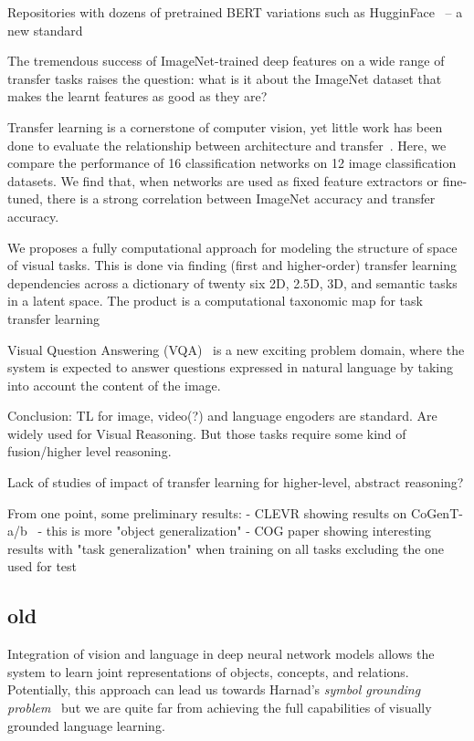 Repositories with dozens of pretrained BERT variations such as HugginFace~\cite{wolf2019transformers} -- a new standard



The tremendous success of ImageNet-trained deep features on a wide range of transfer tasks raises the question:
what is it about the ImageNet dataset that makes the learnt
features as good as they are?~\cite{huh2016makes}

Transfer learning is a cornerstone of computer vision,
yet little work has been done to evaluate the relationship
between architecture and transfer~\cite{kornblith2019better}.
Here, we compare the performance of 16 classification networks on 12 image classification datasets. We find that, when networks are used as fixed feature extractors or fine-tuned, there is a strong correlation between ImageNet accuracy and transfer accuracy.

We proposes a fully computational approach for modeling the structure of space of visual tasks. This is done via
finding (first and higher-order) transfer learning dependencies across a dictionary of twenty six 2D, 2.5D, 3D, and
semantic tasks in a latent space. The product is a computational taxonomic map for task transfer learning~\cite{zamir2018taskonomy}



Visual Question Answering (VQA)~\cite{malinowski2014multi,antol2015vqa} is a new exciting problem domain, where the system is expected to answer questions expressed in natural language by taking into account the content of the image.

Conclusion:
TL for image, video(?) and language engoders are standard.
Are widely used for Visual Reasoning. But those tasks require some kind of fusion/higher level reasoning.
 
Lack of studies of impact of transfer learning for higher-level, abstract reasoning?

From one point, some preliminary results:
 - CLEVR showing results on CoGenT-a/b~\cite{johnson2017clevr} - this is more "object generalization"
 - COG paper showing interesting results with "task generalization" when training on all tasks excluding the one used for test~\cite{yang2018dataset}


\subsection{old}
Integration of vision and language in deep neural network models allows the system to learn joint representations of objects, concepts, and relations.  Potentially, this approach can lead us towards Harnad's \textit{symbol grounding problem}~\cite{harnad2003symbol} but we are quite far from achieving the full capabilities of visually grounded language learning.


